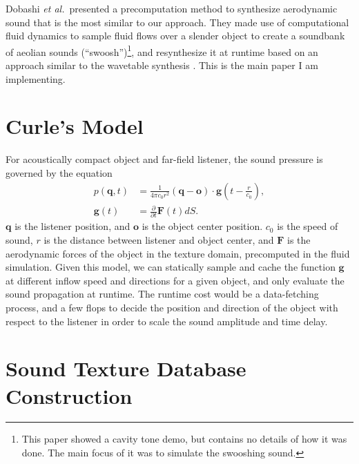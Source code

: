 \documentclass[tog]{acmsiggraph}
\def\p{\partial}
\def\f{\frac}
\def\mb{\mathbf}
\def\etal{\emph{et al.}}
\begin{document}
Dobashi \etal~presented a precomputation method to synthesize aerodynamic sound that is the most similar to our approach. They made use of computational fluid dynamics to sample fluid flows over a slender object to create a soundbank of aeolian sounds (``swoosh'')\footnote{This paper showed a cavity tone demo, but contains no details of how it was done. The main focus of it was to simulate the swooshing sound.}, and resynthesize it at runtime based on an approach similar to the wavetable synthesis \cite{vandenDoel2001}. This is the main paper I am implementing.


\section{Curle's Model}  \label{section:curle}

For acoustically compact object and far-field listener, the sound pressure is governed by the equation \cite{curle}
\begin{align}
    p(\mathbf{q}, t) &= \f{1}{4\pi c_0 r^2} (\mb{q} - \mb{o}) \cdot \mb{g}(t-\f{r}{c_0}), \\
    \mb{g}(t) &= \f{\p}{\p t}\mb{F}(t) dS.
\end{align}
$\mb{q}$ is the listener position, and $\mb{o}$ is the object center position. $c_0$ is the speed of sound, $r$ is the distance between listener and object center, and $\mb{F}$ is the aerodynamic forces of the object in the texture domain, precomputed in the fluid simulation. Given this model, we can statically sample and cache the function $\mb{g}$ at different inflow speed and directions for a given object, and only evaluate the sound propagation at runtime. The runtime cost would be a data-fetching process, and a few flops to decide the position and direction of the object with respect to the listener in order to scale the sound amplitude and time delay.


\section{Sound Texture Database Construction}  \label{section:sound_texture}
\end{document}

